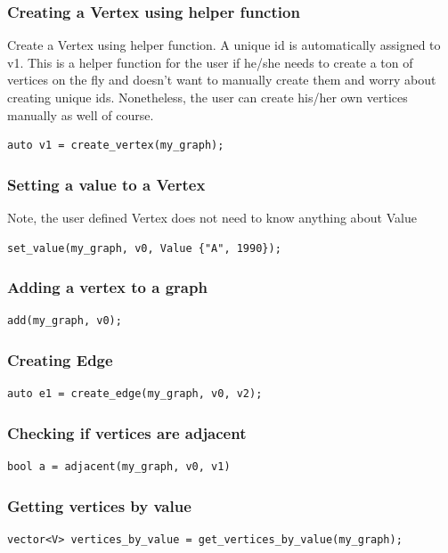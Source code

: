 \documentclass{article}
\begin{document}
\subsubsection{Creating a Vertex using helper function}
Create a Vertex using helper function. A unique id is automatically assigned to v1. This is a helper function for the user if he/she needs to create a ton of vertices on the fly and doesn't want to manually create them and worry about creating unique ids. Nonetheless, the user can create his/her own vertices manually as well of course. 
\begin{lstlisting}
auto v1 = create_vertex(my_graph);
\end{lstlisting}

\subsubsection{Setting a value to a Vertex}
Note, the user defined Vertex does not need to know anything about Value
\begin{lstlisting}
set_value(my_graph, v0, Value {"A", 1990});
\end{lstlisting}

\subsubsection{Adding a vertex to a graph}
\begin{lstlisting}
add(my_graph, v0);
\end{lstlisting}

\subsubsection{Creating Edge}
\begin{lstlisting}
auto e1 = create_edge(my_graph, v0, v2);
\end{lstlisting}

\subsubsection{Checking if vertices are adjacent}
\begin{lstlisting}
bool a = adjacent(my_graph, v0, v1)
\end{lstlisting}

\subsubsection{Getting vertices by value}
\begin{lstlisting}
vector<V> vertices_by_value = get_vertices_by_value(my_graph);
\end{lstlisting}
\end{document}
